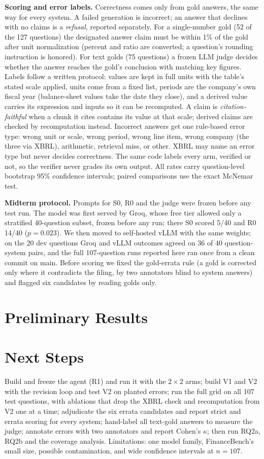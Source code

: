 \documentclass{article}
\begin{document}
\textbf{Scoring and error labels.} Correctness comes only from gold answers, the same way for every system. A failed generation is incorrect; an answer that declines with no claims is a \emph{refusal}, reported separately. For a single-number gold (52 of the 127 questions) the designated answer claim must be within 1\% of the gold after unit normalization (percent and ratio are converted; a question's rounding instruction is honored). For text golds (75 questions) a frozen LLM judge decides whether the answer reaches the gold's conclusion with matching key figures. Labels follow a written protocol: values are kept in full units with the table's stated scale applied, units come from a fixed list, periods are the company's own fiscal year (balance-sheet values take the date they close), and a derived value carries its expression and inputs so it can be recomputed. A claim is \emph{citation-faithful} when a chunk it cites contains its value at that scale; derived claims are checked by recomputation instead. Incorrect answers get one rule-based error type: wrong unit or scale, wrong period, wrong line item, wrong company (the three via XBRL), arithmetic, retrieval miss, or other. XBRL may name an error type but never decides correctness. The same code labels every arm, verified or not, so the verifier never grades its own output. All rates carry question-level bootstrap 95\% confidence intervals; paired comparisons use the exact McNemar test.

\textbf{Midterm protocol.} Prompts for S0, R0 and the judge were frozen before any test run. The model was first served by Groq, whose free tier allowed only a stratified 40-question subset, frozen before any run; there S0 scored 5/40 and R0 14/40 ($p=0.023$). We then moved to self-hosted vLLM with the same weights; on the 20 dev questions Groq and vLLM outcomes agreed on 36 of 40 question-system pairs, and the full 107-question runs reported here ran once from a clean commit on main. Before scoring we fixed the gold-errata rule (a gold is corrected only where it contradicts the filing, by two annotators blind to system answers) and flagged six candidates by reading golds only.

\section{Preliminary Results}


\section{Next Steps}
Build and freeze the agent (R1) and run it with the $2\times2$ arms; build V1 and V2 with the revision loop and test V2 on planted errors; run the full grid on all 107 test questions, with ablations that drop the XBRL check and recomputation from V2 one at a time; adjudicate the six errata candidates and report strict and errata scoring for every system; hand-label all text-gold answers to measure the judge; annotate errors with two annotators and report Cohen's $\kappa$; then run RQ2a, RQ2b and the coverage analysis. Limitations: one model family, FinanceBench's small size, possible contamination, and wide confidence intervals at $n=107$.

{\small\setlength{\bibsep}{2pt}

}
\end{document}
